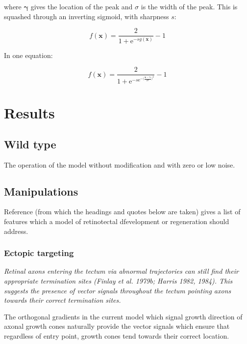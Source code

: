 \documentclass[11pt, a4paper]{article}
\newcommand{\mb}[1]{\mathbf{#1}} %
\begin{document}
where $\mb{\gamma}$ gives the location of the peak and $\sigma$ is the width
of the peak. This is squashed through an inverting sigmoid, with sharpness $s$:

\begin{equation}\label{eq:f}
f(\mb{x}) = \frac{2}{1 + \mathrm{e}^{-s g(\mb{x})}} - 1
\end{equation}

In one equation:

\begin{equation}\label{eq:gf}
f(\mb{x}) = \frac{2}{1 + \mathrm{e}^{-s \mathrm{e}^{-\big(\frac{\mb{x}-\mb{\gamma}}{2\sigma}\big)^2 } }} - 1
\end{equation}


\section{Results}

\subsection{Wild type}

The operation of the model without modification and with zero or low noise.

\subsection{Manipulations}

Reference \cite{goodhill_development_2005} (from which the headings and quotes
below are taken) gives a list of features which a model of retinotectal
dfevelopment or regeneration should address.

\subsubsection{Ectopic targeting}

\begin{displayquote}
\emph{Retinal axons entering the tectum via abnormal trajectories can still find
their appropriate termination sites (Finlay et al. 1979b; Harris 1982,
1984). This suggests the presence of vector signals throughout the tectum
pointing axons towards their correct termination sites.}
\end{displayquote}

The orthogonal gradients in the current model which signal growth direction of
axonal growth cones naturally provide the vector signals which ensure that
regardless of entry point, growth cones tend towards their correct location.
\end{document}
